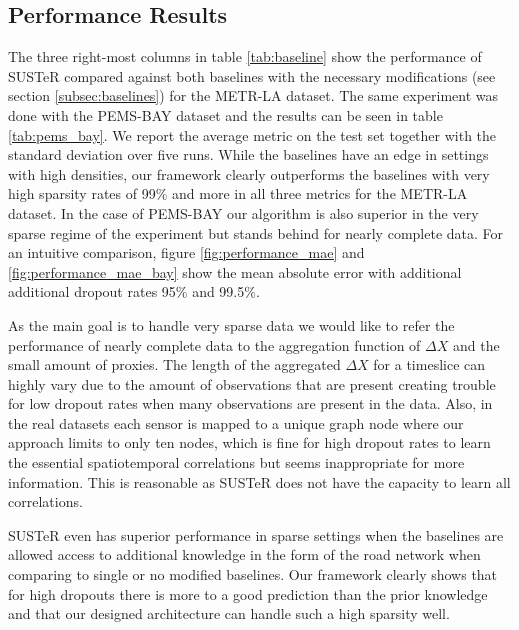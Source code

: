 \subsection{Performance Results}
\label{subsec:performance}
The three right-most columns in table \ref{tab:baseline} show the performance of SUSTeR compared against both baselines with the necessary modifications (see section \ref{subsec:baselines}) for the METR-LA dataset.
The same experiment was done with the PEMS-BAY dataset and the results can be seen in table \ref{tab:pems_bay}.
We report the average metric on the test set together with the standard deviation over five runs.
While the baselines have an edge in settings with high densities, our framework clearly outperforms the baselines with very high sparsity rates of 99\% and more in all three metrics for the METR-LA dataset.
In the case of PEMS-BAY our algorithm is also superior in the very sparse regime of the experiment but stands behind for nearly complete data.
For an intuitive comparison, figure \ref{fig:performance_mae} and \ref{fig:performance_mae_bay} show the mean absolute error with additional additional dropout rates 95\% and 99.5\%.

As the main goal is to handle very sparse data we would like to refer the performance of nearly complete data to the aggregation function of $\Delta X$ and the small amount of proxies.
The length of the aggregated $\Delta X$ for a timeslice can highly vary due to the amount of observations that are present creating trouble for low dropout rates when many observations are present in the data. 
Also, in the real datasets each sensor is mapped to a unique graph node where our approach limits to only ten nodes, which is fine for high dropout rates to learn the essential spatiotemporal correlations but seems inappropriate for more information. 
This is reasonable as SUSTeR does not have the capacity to learn all correlations.

SUSTeR even has superior performance in sparse settings when the baselines are allowed access to additional knowledge in the form of the road network when comparing to single or no modified baselines.
Our framework clearly shows that for high dropouts there is more to a good prediction than the prior knowledge and that our designed architecture can handle such a high sparsity well.


